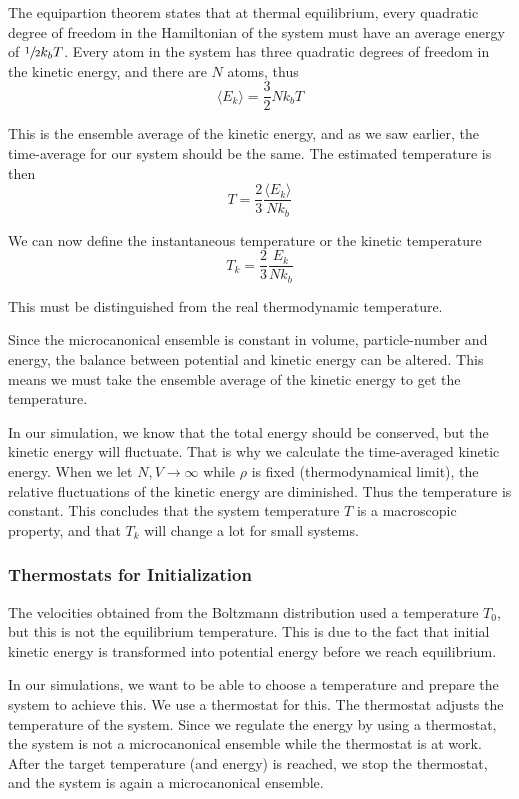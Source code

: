 \documentclass[11pt]{article}
\numberwithin{equation}{section}
\numberwithin{figure}{section}
\begin{document}
The equipartion theorem states that at thermal equilibrium,
every quadratic degree of freedom in the Hamiltonian of the system
must have an average energy of $\sfrac{1}{2}k_b T$.
Every atom in the system has three quadratic degrees of freedom in the
kinetic energy, and there
are $N$ atoms, thus
\begin{equation}
    \langle E_k \rangle = \frac{3}{2}N k_b T
\end{equation} 

This is the ensemble average of the kinetic energy,
and as we saw earlier, the time-average for our system should be the same.
The estimated temperature is then
\begin{equation}
    T = \frac{2}{3} \frac{\langle E_k \rangle}{N k_b}
\end{equation}

We can now define the instantaneous temperature or the kinetic temperature
\begin{equation}
    T_k = \frac{2}{3} \frac{E_k}{N k_b}
\end{equation}

This must be distinguished from the real thermodynamic
temperature.

Since the microcanonical ensemble is constant
in volume, particle-number and energy,
the balance between potential and kinetic
energy can be altered.
This means we must take the ensemble average
of the kinetic energy to get the temperature.

In our simulation, we know that the total energy
should be conserved, but the kinetic energy will fluctuate.
That is why we calculate the time-averaged kinetic energy.
When we let $N, V \rightarrow \infty$ 
while $\rho$ is fixed (thermodynamical limit),
the relative fluctuations of the kinetic energy are diminished.
Thus the temperature is constant.
This concludes that the system temperature $T$ is a macroscopic
property, and that $T_k$ will change a lot for small systems.

\subsubsection{Thermostats for Initialization}
The velocities obtained from the Boltzmann distribution
used a temperature $T_0$, but this is not the
equilibrium temperature. This is due to the fact
that initial kinetic energy is transformed into potential
energy before we reach equilibrium.

In our simulations, we want to be able to
choose a temperature and prepare the system to 
achieve this.
We use a thermostat for this.
The thermostat adjusts the temperature of the system.
Since we regulate the energy by using a thermostat,
the system is not a microcanonical ensemble while
the thermostat is at work.
After the target temperature (and energy) is reached,
we stop the thermostat, and
the system is again a microcanonical ensemble.
\end{document}
